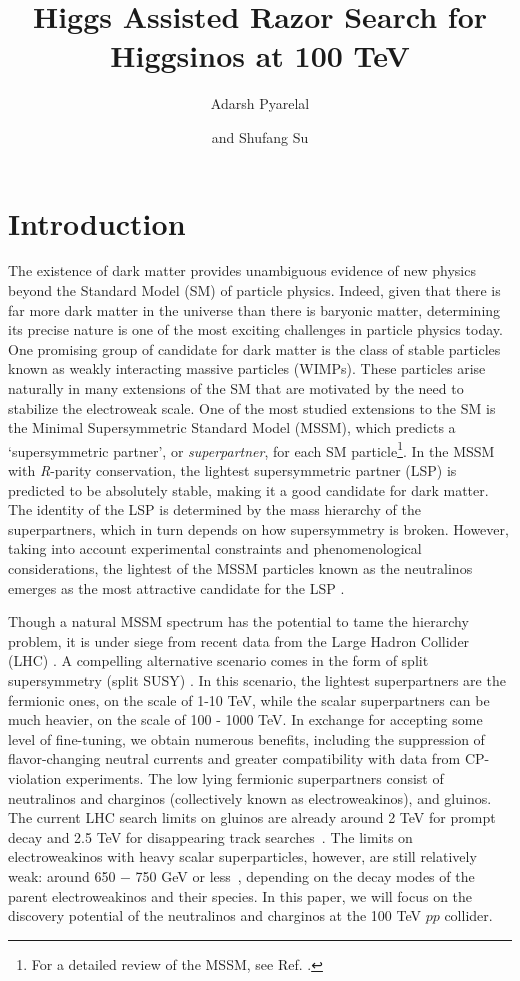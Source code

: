 \documentclass[a4paper,11pt]{article}
\title{Higgs Assisted Razor Search for Higgsinos at 100 TeV}
\author[a]{Adarsh Pyarelal}
\author[b]{and Shufang Su}
\affiliation[a]{School of Information, University of Arizona, Tucson, AZ 85721 , USA}
\affiliation[b]{Department of Physics, University of Arizona, Tucson, AZ 85718, USA}
\begin{document}
 
\maketitle

\section{Introduction}
 
The existence of dark matter provides unambiguous evidence of new physics
beyond the Standard Model (SM) of particle physics. Indeed, given that there is
far more dark matter in the universe than there is baryonic matter, determining
its precise nature is one of the most exciting challenges in particle physics
today.  One promising group of candidate for dark matter is the class of stable
particles known as weakly interacting massive particles (WIMPs). These
particles arise naturally in many extensions of the SM that are motivated by
the need to stabilize the electroweak scale. One of the most studied extensions
to the SM is the Minimal Supersymmetric Standard Model (MSSM), which predicts a
`supersymmetric partner', or \emph{superpartner}, for each SM
particle\footnote{For a detailed review of the MSSM, see Ref.
\cite{Martin:1997ns}.}. In the MSSM with \emph{R}-parity conservation, the
lightest supersymmetric partner (LSP) is predicted to be absolutely stable,
making it a good candidate for dark matter. The identity of the LSP is
determined by the mass hierarchy of the superpartners, which in turn depends on
how supersymmetry is broken.  However, taking into account experimental
constraints and phenomenological considerations, the lightest of the MSSM
particles known as the neutralinos emerges as the most attractive candidate
for the LSP \cite{Bertone:2004pz}. 

Though a natural MSSM spectrum has the potential to tame the hierarchy problem,
it is under siege from recent data from the Large Hadron Collider (LHC)
\cite{Aaboud:2018ujj, Sirunyan:2018vjp}.  A compelling alternative scenario
comes in the form of split supersymmetry (split SUSY) \cite{Wells:2003tf,
ArkaniHamed:2004yi, Giudice:2004tc}. In this scenario, the lightest
superpartners are the fermionic ones, on the scale of 1-10 TeV, while the
scalar superpartners can be much heavier, on the scale of 100 - 1000 TeV. In
exchange for accepting some level of fine-tuning, we obtain numerous benefits,
including the suppression of flavor-changing neutral currents and greater
compatibility with data from CP-violation experiments.  The low lying fermionic
superpartners consist of neutralinos and charginos (collectively known as
electroweakinos), and gluinos. The current LHC search limits on gluinos are
already around 2 TeV for prompt decay and 2.5 TeV for disappearing track
searches~\cite{CMS-PAS-SUS-19-005}.   The limits on electroweakinos with heavy
scalar superparticles, however, are still relatively weak: around 650 $-$ 750
GeV or less~\cite{ATL-PHYS-PUB-2019-022, Sirunyan:2017lae, Aaboud:2018htj,
Sirunyan:2018ubx, Aaboud:2018zeb}, depending on the decay modes of the parent
electroweakinos and their species.  In this paper, we will focus on the
discovery potential of the neutralinos and charginos at the 100 TeV $pp$
collider. 
\end{document}
